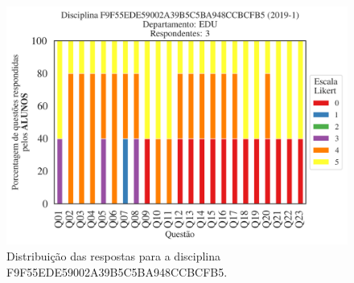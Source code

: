 \documentclass[a4paper,10pt]{article}
\begin{document}
\begin{figure}[h]
\centering
\includegraphics[width=0.485\linewidth]{analise_disciplina_departamento_EDU_ALUNO_TURMA_F9F55EDE59002A39B5C5BA948CCBCFB5.png}
\caption{\label{fig:analise_geral_departamento}                Distribuição das respostas para a disciplina F9F55EDE59002A39B5C5BA948CCBCFB5.}
\end{figure}
\end{document}
